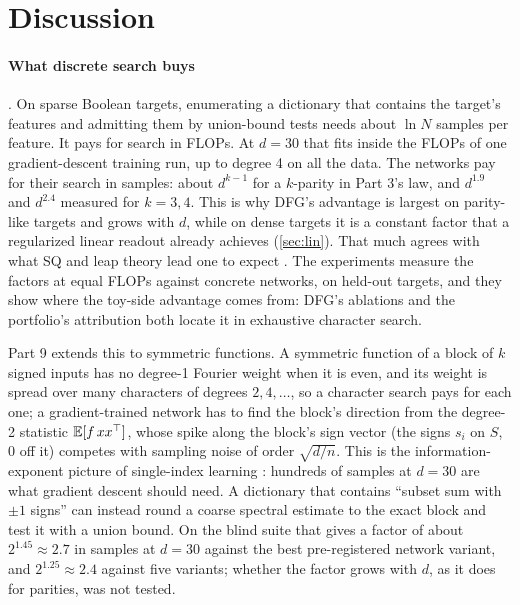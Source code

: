 \section{Discussion}\label{sec:discussion}

\paragraph{What discrete search buys} . On sparse Boolean targets, enumerating a dictionary that contains the target's features and admitting them by union-bound tests needs about $\ln N$ samples per feature. It pays for search in FLOPs. At $d=30$ that fits inside the FLOPs of one gradient-descent training run, up to degree 4 on all the data. The networks pay for their search in samples: about $d^{k-1}$ for a $k$-parity in Part 3's law, and $d^{1.9}$ and $d^{2.4}$ measured for $k=3,4$. This is why DFG's advantage is largest on parity-like targets and grows with $d$, while on dense targets it is a constant factor that a regularized linear readout already achieves (\cref{sec:lin}). That much agrees with what SQ and leap theory lead one to expect \cite{abbe2023leap,barak2022hidden,edelman2023pareto}. The experiments measure the factors at equal FLOPs against concrete networks, on held-out targets, and they show where the toy-side advantage comes from: DFG's ablations and the portfolio's attribution both locate it in exhaustive character search.

Part 9 extends this to symmetric functions. A symmetric function of a block of $k$ signed inputs has no degree-1 Fourier weight when it is even, and its weight is spread over many characters of degrees $2,4,\dots$, so a character search pays for each one; a gradient-trained network has to find the block's direction from the degree-2 statistic $\mathbb{E}[f\,xx^\top]$, whose spike along the block's sign vector (the signs $s_i$ on $S$, $0$ off it) competes with sampling noise of order $\sqrt{d/n}$. This is the information-exponent picture of single-index learning \cite{benarous2021online,damian2024gaps}: hundreds of samples at $d=30$ are what gradient descent should need. A dictionary that contains ``subset sum with $\pm1$ signs'' can instead round a coarse spectral estimate to the exact block and test it with a union bound. On the blind suite that gives a factor of about $2^{1.45}\approx2.7$ in samples at $d=30$ against the best pre-registered network variant, and $2^{1.25}\approx2.4$ against five variants; whether the factor grows with $d$, as it does for parities, was not tested.

